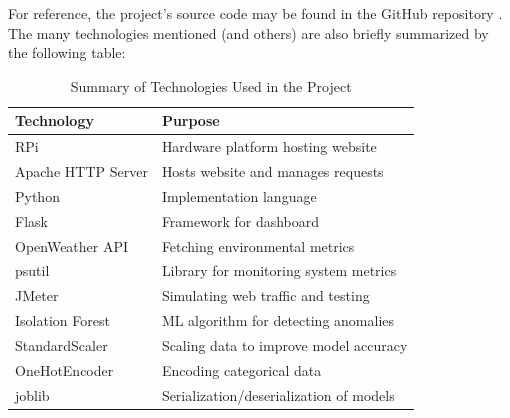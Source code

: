 \documentclass[conference]{IEEEtran}
\begin{document}
For reference, the project's source code may be found in the GitHub repository \cite{arthur_github}. The many technologies mentioned (and others) are also briefly summarized by the following table:

\begin{table}[ht]
    \centering
    \caption{Summary of Technologies Used in the Project}
    \label{tab:technologies}
    \small
    \begin{tabular}{ll}
        \toprule
        \textbf{Technology} & \textbf{Purpose}                        \\
        \midrule
        RPi                 & Hardware platform hosting website       \\
        Apache HTTP Server  & Hosts website and manages requests      \\
        Python              & Implementation language                 \\
        Flask               & Framework for dashboard                 \\
        OpenWeather API     & Fetching environmental metrics          \\
        psutil              & Library for monitoring system metrics   \\
        JMeter              & Simulating web traffic and testing      \\
        Isolation Forest    & ML algorithm for detecting anomalies    \\
        StandardScaler      & Scaling data to improve model accuracy  \\
        OneHotEncoder       & Encoding categorical data               \\
        joblib              & Serialization/deserialization of models \\
        \bottomrule
    \end{tabular}
\end{table}
\end{document}
